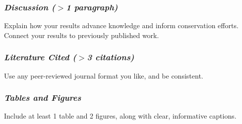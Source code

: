 \documentclass[12pt]{article}
\begin{document}
\subsubsection*{\it Discussion \normalfont ($>$1 paragraph)}
\vspace{-6pt}
Explain how your results advance knowledge and inform conservation
efforts. Connect your results to previously published work.

\subsubsection*{\it Literature Cited \normalfont ($>$3 citations)}
\vspace{-6pt}
Use any peer-reviewed journal format you like, and be consistent.

\subsubsection*{\it Tables and Figures}
\vspace{-6pt}
Include at least 1 table and 2 figures, along with
clear, informative captions. 
\end{document}
